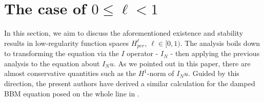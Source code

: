 \documentclass[10pt,a4paper,final]{article}
\numberwithin{equation}{section}
\newtheorem{lemma}[theorem]{Lemma}
\newtheorem{remark}[theorem]{Remark}
\begin{document}

\section{The case of $0\le\ell<1$}
\label{Sec5}


In this section, we aim to discuss the aforementioned existence and stability results in low-regularity function spaces $H_{per}^\ell,\ \ell\in[0, 1)$. The analysis boils down to transforming the equation via the $I$ operator - $I_N$ - then applying the previous analysis to the equation about $I_Nu$. As we pointed out in this paper, there are almost conservative quantities such as the $H^1$-norm of $I_Nu$. Guided by this direction, the present authors have derived a similar calculation for the damped BBM equation posed on the whole line in \cite{LW2}. \\


\end{document}
